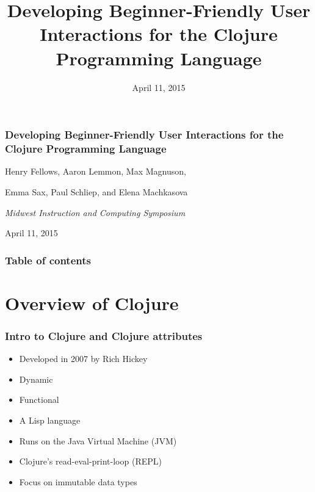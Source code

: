 \documentclass{beamer}
\begin{document}
\title{Developing Beginner-Friendly User Interactions for the Clojure Programming Language}
\date{April 11, 2015}

\begin{frame}
\frametitle{Developing Beginner-Friendly User Interactions for the Clojure Programming Language}
{\centering
\noindent
Henry Fellows, Aaron Lemmon, Max Magnuson, \par
Emma Sax, Paul Schliep, and Elena Machkasova \par

{\it 
Midwest Instruction and Computing Symposium\par
April 11, 2015\par}
}
\end{frame}

\begin{frame}
\frametitle{Table of contents}
\tableofcontents  
\end{frame}

\section{Overview of Clojure}

\begin{frame}
\frametitle{Intro to Clojure and Clojure attributes}
	\begin{itemize}
  	 \item Developed in 2007 by Rich Hickey
  	 \item Dynamic
  	 \item Functional
  	 \item A Lisp language
  	 \item Runs on the Java Virtual Machine (JVM)
  	 \item Clojure's read-eval-print-loop (REPL)
  	 \item Focus on immutable data types
	 \end{itemize}
\end{frame}
\end{document}
